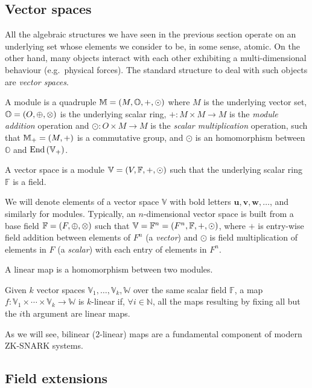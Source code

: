\subsection{Vector spaces}
All the algebraic structures we have seen in the previous section operate on an underlying set 
whose elements we consider to be, in some sense, atomic.
On the other hand, many objects interact with each other exhibiting a multi-dimensional behaviour 
(e.g.\ physical forces).
The standard structure to deal with such objects are \emph{vector spaces}.
\begin{definition}[Module]
  A module is a quadruple \(\mathbb{M} = \left(M, \mathbb{O}, +, \odot\right)\) where 
  \(M\) is the underlying vector set, \(\mathbb{O} = \left(O, \oplus, \otimes\right)\) is the underlying 
  scalar ring, \(+\colon M \times M \to M\) is the \emph{module addition} operation and 
  \(\odot\colon O \times M \to M\) is the \emph{scalar multiplication} operation, such 
  that \(\mathbb{M}_{+} = \left(M, +\right)\) is a commutative group, and \(\odot \) is an 
  homomorphism between \(\mathbb{O}\) and \(\mathrm{End}\left(\mathbb{V}_{+}\right)\).
\end{definition} 

\begin{definition}
  A vector space is a module \(\mathbb{V} = \left(V, \mathbb{F}, +, \odot\right)\) such that the 
  underlying scalar ring \(\mathbb{F}\) is a field.
\end{definition} 

We will denote elements of a vector space \(\mathbb{V}\) with bold letters 
\(\bm{u}, \bm{v}, \bm{w}, \dots \), and similarly for modules.
Typically, an \(n\)-dimensional vector space is built from a base field 
\(\mathbb{F} = \left(F, \oplus, \otimes\right)\) such that \(\mathbb{V} = \mathbb{F}^n = 
\left(F^n, \mathbb{F}, +, \odot\right)\), where \(+\) is entry-wise field addition between elements of 
\(F^n\) (a \emph{vector}) and \(\odot \) is field multiplication of elements in \(F\) 
(a \emph{scalar}) with each entry of elements in \(F^n\).

\begin{definition}
   A linear map is a homomorphism between two modules.
\end{definition}
\begin{definition}
  Given \(k\) vector spaces \(\mathbb{V}_1, \dots, \mathbb{V}_k, \mathbb{W}\) over the same scalar field \(\mathbb{F}\), a map \(f\colon \mathbb{V}_1 \times \cdots \times \mathbb{V}_k \to \mathbb{W}\) 
  is \(k\)-linear if, \(\forall i \in \mathbb{N}\), all the maps resulting by fixing all but the 
  \(i\)th argument are linear maps.
\end{definition}

As we will see, bilinear (\(2\)-linear) maps are a fundamental component of modern ZK-SNARK systems.

\subsection{Field extensions}

